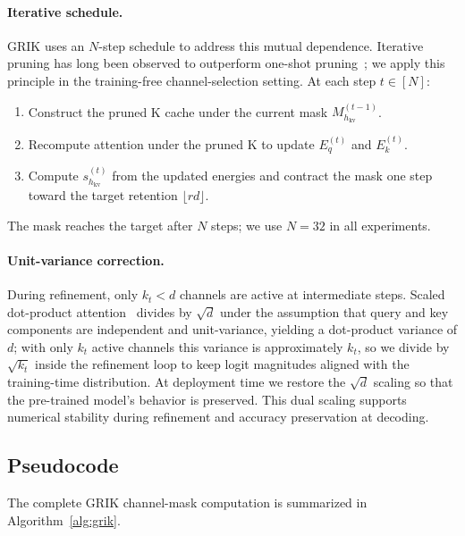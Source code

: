 \documentclass{article}
\begin{document}
\paragraph{Iterative schedule.} GRIK uses an $N$-step schedule to address this mutual dependence. Iterative pruning has long been observed to outperform one-shot pruning~\citep{han2015learning, frankle2019lottery}; we apply this principle in the training-free channel-selection setting. At each step $t \in [N]$:
\begin{enumerate}
    \item Construct the pruned K cache under the current mask $M_{h_{\mathrm{kv}}}^{(t-1)}$.
    \item Recompute attention under the pruned K to update $E_q^{(t)}$ and $E_k^{(t)}$.
    \item Compute $s_{h_{\mathrm{kv}}}^{(t)}$ from the updated energies and contract the mask one step toward the target retention $\lfloor rd \rfloor$.
\end{enumerate}
The mask reaches the target after $N$ steps; we use $N=32$ in all experiments.
 
\paragraph{Unit-variance correction.} During refinement, only $k_t < d$ channels are active at intermediate steps. Scaled dot-product attention~\citep{vaswani2017} divides by $\sqrt{d}$ under the assumption that query and key components are independent and unit-variance, yielding a dot-product variance of $d$; with only $k_t$ active channels this variance is approximately $k_t$, so we divide by $\sqrt{k_t}$ inside the refinement loop to keep logit magnitudes aligned with the training-time distribution. At deployment time we restore the $\sqrt{d}$ scaling so that the pre-trained model's behavior is preserved. This dual scaling supports numerical stability during refinement and accuracy preservation at decoding.
 
\subsection{Pseudocode}
 
The complete GRIK channel-mask computation is summarized in Algorithm~\ref{alg:grik}.
 
\end{document}
